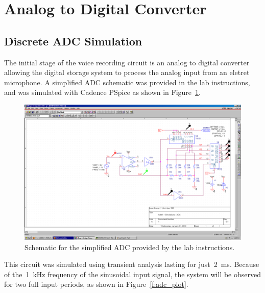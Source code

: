 \section{Analog to Digital Converter}
\subsection{Discrete ADC Simulation}
The initial stage of the voice recording circuit is an analog to digital
converter allowing the digital storage system to process the analog input from
an eletret microphone.  A simplified ADC schematic was provided in the lab
instructions, and was simulated with Cadence PSpice as shown in
Figure~\ref{f:adc_schem}.
%
\begin{figure}[H]
\centering
	\includegraphics[width=.8\textwidth]{img/shot/part2_schem.PNG}
	\parbox{.8\textwidth}{
	\caption[Discrete ADC --- Schematic]{Schematic for the simplified ADC
	provided by the lab instructions.}
	\label{f:adc_schem}}
\end{figure}
%
This circuit was simulated using transient analysis lasting for
just~\SI{2}{\milli\second}.  Because of the~\SI{1}{\kilo\hertz} frequency of
the sinusoidal input signal, the system will be observed for two full input
periods, as shown in Figure~\ref{f:adc_plot}.

